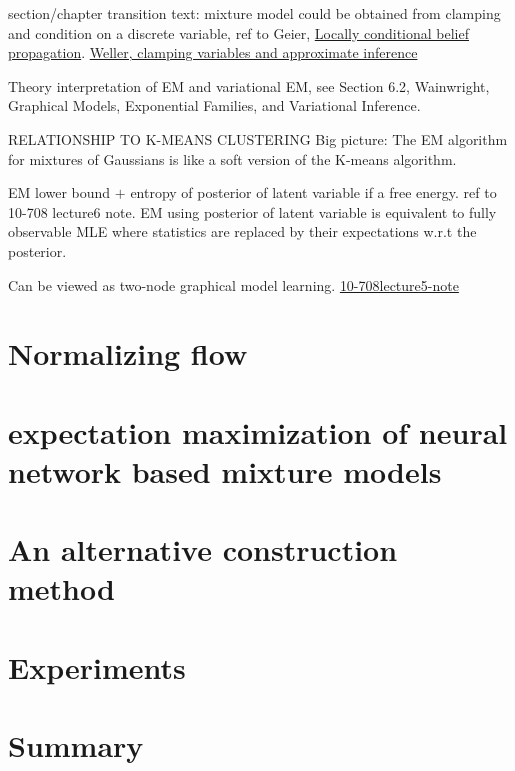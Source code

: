 section/chapter transition text: mixture model could be obtained from clamping and condition on a discrete variable, ref to Geier, \href{http://auai.org/uai2015/proceedings/papers/158.pdf}{Locally conditional belief propagation}. \href{https://papers.nips.cc/paper/5529-clamping-variables-and-approximate-inference.pdf}{Weller, clamping variables and approximate inference}

\begin{remark}
Theory interpretation of EM and variational EM, see Section 6.2, Wainwright, Graphical Models, Exponential Families, and Variational Inference.
\end{remark}


\begin{remark}
  RELATIONSHIP TO K-MEANS CLUSTERING
  Big picture: The EM algorithm for mixtures of Gaussians is like a soft version of the K-means algorithm.
\end{remark}

\begin{remark}
  EM lower bound $+$ entropy of posterior of latent variable if a free energy. ref to 10-708 lecture6 note.
  EM using posterior of latent variable is equivalent to fully observable MLE where statistics are replaced by their expectations w.r.t the posterior.
\end{remark}

Can be viewed as two-node graphical model learning. \href{https://sailinglab.github.io/pgm-spring-2019/notes/lecture-05/}{10-708lecture5-note}
\section{Normalizing flow}

\section{expectation maximization of neural network based mixture models}

\section{An alternative construction method}

\section{Experiments}


\section{Summary}

